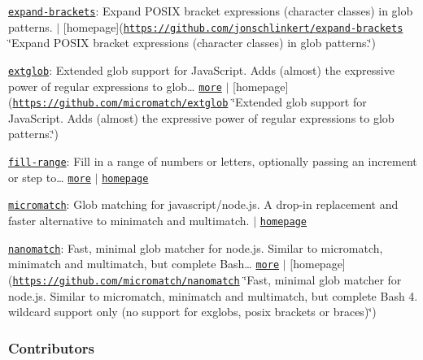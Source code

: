 \begin{DoxyItemize}
\item \href{https://www.npmjs.com/package/expand-brackets}{\tt expand-\/brackets}\+: Expand P\+O\+S\+IX bracket expressions (character classes) in glob patterns. $\vert$ \mbox{[}homepage\mbox{]}(\href{https://github.com/jonschlinkert/expand-brackets}{\tt https\+://github.\+com/jonschlinkert/expand-\/brackets} \char`\"{}\+Expand P\+O\+S\+I\+X bracket expressions (character classes) in glob patterns.\char`\"{})
\item \href{https://www.npmjs.com/package/extglob}{\tt extglob}\+: Extended glob support for Java\+Script. Adds (almost) the expressive power of regular expressions to glob… \href{https://github.com/micromatch/extglob}{\tt more} $\vert$ \mbox{[}homepage\mbox{]}(\href{https://github.com/micromatch/extglob}{\tt https\+://github.\+com/micromatch/extglob} \char`\"{}\+Extended glob support for Java\+Script. Adds (almost) the expressive power of regular expressions to glob patterns.\char`\"{})
\item \href{https://www.npmjs.com/package/fill-range}{\tt fill-\/range}\+: Fill in a range of numbers or letters, optionally passing an increment or {\ttfamily step} to… \href{https://github.com/jonschlinkert/fill-range}{\tt more} $\vert$ \href{https://github.com/jonschlinkert/fill-range}{\tt homepage}
\item \href{https://www.npmjs.com/package/micromatch}{\tt micromatch}\+: Glob matching for javascript/node.\+js. A drop-\/in replacement and faster alternative to minimatch and multimatch. $\vert$ \href{https://github.com/micromatch/micromatch}{\tt homepage}
\item \href{https://www.npmjs.com/package/nanomatch}{\tt nanomatch}\+: Fast, minimal glob matcher for node.\+js. Similar to micromatch, minimatch and multimatch, but complete Bash… \href{https://github.com/micromatch/nanomatch}{\tt more} $\vert$ \mbox{[}homepage\mbox{]}(\href{https://github.com/micromatch/nanomatch}{\tt https\+://github.\+com/micromatch/nanomatch} \char`\"{}\+Fast, minimal glob matcher for node.\+js. Similar to micromatch, minimatch and multimatch, but complete Bash 4. wildcard support only (no support for exglobs, posix brackets or braces)\char`\"{})
\end{DoxyItemize}

\subsubsection*{Contributors}

